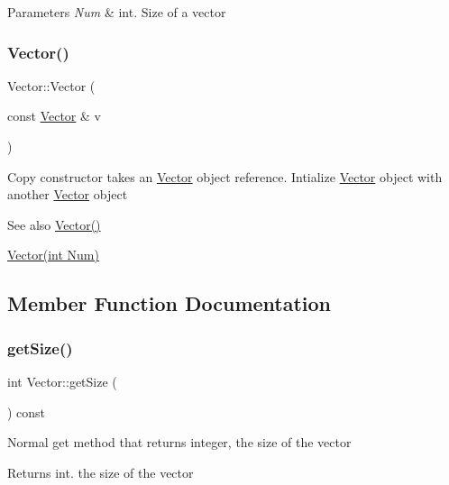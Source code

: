 \begin{DoxyParams}{Parameters}
{\em Num} & int. Size of a vector \\
\hline
\end{DoxyParams}
\mbox{\label{class_vector_a5f04e343b7306ad11f8a82c89b486764}} 
\subsubsection{\texorpdfstring{Vector()}{Vector()}\hspace{0.1cm}{\footnotesize\ttfamily [3/3]}}
{\footnotesize\ttfamily Vector\+::\+Vector (\begin{DoxyParamCaption}\item[{const \hyperlink{class_vector}{Vector} \&}]{v }\end{DoxyParamCaption})}

Copy constructor takes an \hyperlink{class_vector}{Vector} object reference. Intialize \hyperlink{class_vector}{Vector} object with another \hyperlink{class_vector}{Vector} object \begin{DoxySeeAlso}{See also}
\hyperlink{class_vector_a6f80c73b5f18dcf3f8e36065bdc8b9e5}{Vector()} 

\hyperlink{class_vector_acbdf66550f2caa0a64e0b356fb63a277}{Vector(int Num)} 
\end{DoxySeeAlso}


\subsection{Member Function Documentation}
\mbox{\label{class_vector_afbb7966ec4107c43ec15cccc47fcaef7}} 
\subsubsection{\texorpdfstring{get\+Size()}{getSize()}}
{\footnotesize\ttfamily int Vector\+::get\+Size (\begin{DoxyParamCaption}{ }\end{DoxyParamCaption}) const}

Normal get method that returns integer, the size of the vector \begin{DoxyReturn}{Returns}
int. the size of the vector 
\end{DoxyReturn}
\mbox{\label{class_vector_a6752a90058ddef427ca6aed12946a737}} 
